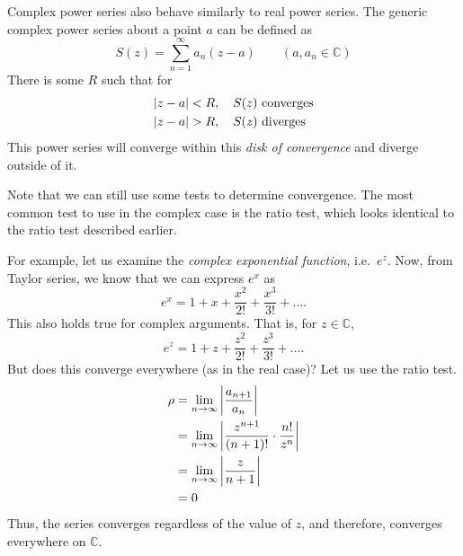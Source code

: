 \documentclass[10pt]{scrartcl}
\numberwithin{equation}{subsection}
\theoremstyle{definition}
\theoremstyle{remark}
\newcommand{\Complex}{\mathbb{C}}
\begin{document}
Complex power series also behave similarly to real power series. The generic
complex power series about a point $a$ can be defined as
\begin{equation}
	S(z) = \sum_{n=1}^{\infty} a_n (z - a) \qquad (a, a_n \in \Complex)
\end{equation}
There is some $R$ such that for
\begin{align*}
	\abs{z-a} &< R, \quad S(z)~\text{converges} \\
	\abs{z-a} &> R, \quad S(z)~\text{diverges} \\
\end{align*}
This power series will converge within this \textit{disk of convergence} and
diverge outside of it.

Note that we can still use some tests to determine convergence. The most common
test to use in the complex case is the ratio test, which looks identical to the
ratio test described earlier.

For example, let us examine the \textit{complex exponential function}, i.e.\
$e^z$. Now, from Taylor series, we know that we can express $e^x$ as
\[
	e^x = 1 + x + \frac{x^2}{2!} + \frac{x^3}{3!} + \ldots.
\]
This also holds true for complex arguments. That is, for $z \in \Complex$,
\begin{equation}
	e^z = 1 + z + \frac{z^2}{2!} + \frac{z^3}{3!} + \ldots.
\end{equation}
But does this converge everywhere (as in the real case)? Let us use the ratio
test.
\begin{align*}
	\rho &= \lim_{n \to \infty} \abs{\frac{a_{n+1}}{a_n}} \\
      &= \lim_{n \to \infty} \abs{\frac{z^{n+1}}{(n+1)!} \cdot \frac{n!}{z^n}} \\
      &= \lim_{n \to \infty} \abs{\frac{z}{n+1}} \\
      &= 0
\end{align*}
Thus, the series converges regardless of the value of $z$, 
and therefore, converges everywhere on $\Complex$.
\end{document}
